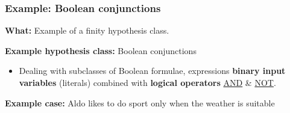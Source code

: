 \documentclass[12pt, a4paper]{article}
\begin{document}
\subsubsection{Example: Boolean conjunctions
}\label{example-boolean-conjunctions}


\textbf{What:} Example of a finity hypothesis class.

\bigskip \bigskip


\textbf{Example hypothesis class:} Boolean conjunctions

\begin{itemize}
  \item Dealing with subclasses of Boolean formulae, expressions \textbf{binary input variables} (literals) combined with \textbf{logical operators} \uline{AND} \& \uline{NOT}.
\end{itemize}

\bigskip \bigskip


\textbf{Example case:} Aldo likes to do sport only when the weather is suitable
\end{document}
